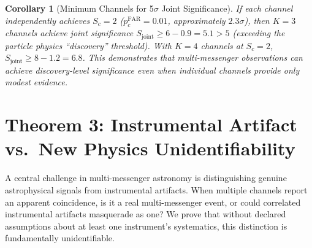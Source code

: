 \documentclass[11pt,a4paper]{article}
\newtheorem{corollary}[theorem]{Corollary}
\theoremstyle{definition}
\begin{document}
\begin{corollary}[Minimum Channels for 5$\sigma$ Joint Significance]\label{cor:min_channels}
If each channel independently achieves $S_c = 2$ ($p_c^{\mathrm{FAR}} = 0.01$, approximately $2.3\sigma$), then $K=3$ channels achieve joint significance $S_{\mathrm{joint}} \geq 6 - 0.9 = 5.1 > 5$ (exceeding the particle physics ``discovery'' threshold). With $K=4$ channels at $S_c = 2$, $S_{\mathrm{joint}} \geq 8 - 1.2 = 6.8$. This demonstrates that multi-messenger observations can achieve discovery-level significance even when individual channels provide only modest evidence.
\end{corollary}
\section{Theorem 3: Instrumental Artifact vs.\ New Physics Unidentifiability}
\label{sec:unidentifiability}
A central challenge in multi-messenger astronomy is distinguishing genuine astrophysical signals from instrumental artifacts. When multiple channels report an apparent coincidence, is it a real multi-messenger event, or could correlated instrumental artifacts masquerade as one? We prove that without declared assumptions about at least one instrument's systematics, this distinction is fundamentally unidentifiable.
\end{document}
